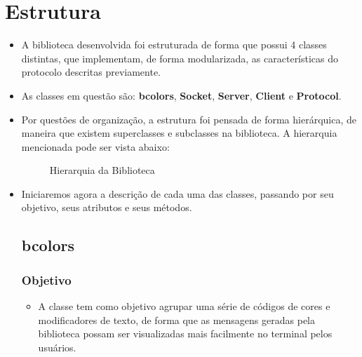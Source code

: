 \documentclass[10pt]{article}
\begin{document}
\section{Estrutura}
    \begin{itemize}
    \item A biblioteca desenvolvida foi estruturada de forma que possui 4 classes distintas, que implementam, de forma modularizada, as características do protocolo descritas previamente. 
    \item As classes em questão são: \textbf{bcolors}, \textbf{Socket}, \textbf{Server}, \textbf{Client} e \textbf{Protocol}.
    \item Por questões de organização, a estrutura foi pensada de forma hierárquica, de maneira que existem superclasses e subclasses na biblioteca. A hierarquia mencionada pode ser vista abaixo:
    
    \begin{figure}[ht]
    \caption{Hierarquia da Biblioteca}
    \label{fig:diagrama}
    \end{figure}
    
    \item Iniciaremos agora a descrição de cada uma das classes, passando por seu objetivo, seus atributos e seus métodos.

    \subsection{\Large bcolors}
        \subsubsection{\large Objetivo}
            \begin{itemize}
            \item A classe tem como objetivo agrupar uma série de códigos de cores e modificadores de
            texto, de forma que as mensagens geradas pela biblioteca possam ser visualizadas mais
            facilmente no terminal pelos usuários.
            \end{itemize}

\end{itemize}
\end{document}
